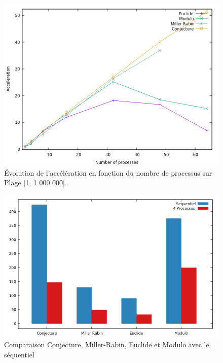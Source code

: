 	\begin{frame}
	\begin{figure}[!ht]	
		\begin{center}\includegraphics[scale=0.55]{Acc_All_1M_v2.png}\end{center}
		\caption{Évolution de l’accélération en fonction du nombre de processus sur Plage [1, 1 000 000].}
		\label{fg:fig4}
	\end{figure}	
	\end{frame}
		
	\begin{frame}
	\begin{figure}[!ht]	
		\begin{center}\includegraphics[scale=0.4]{Bar1.png}\end{center}
		\caption{Comparaison Conjecture, Miller-Rabin, Euclide et Modulo avec le séquentiel}
		\label{fg:fig3}
	\end{figure}	
	\end{frame}
		
